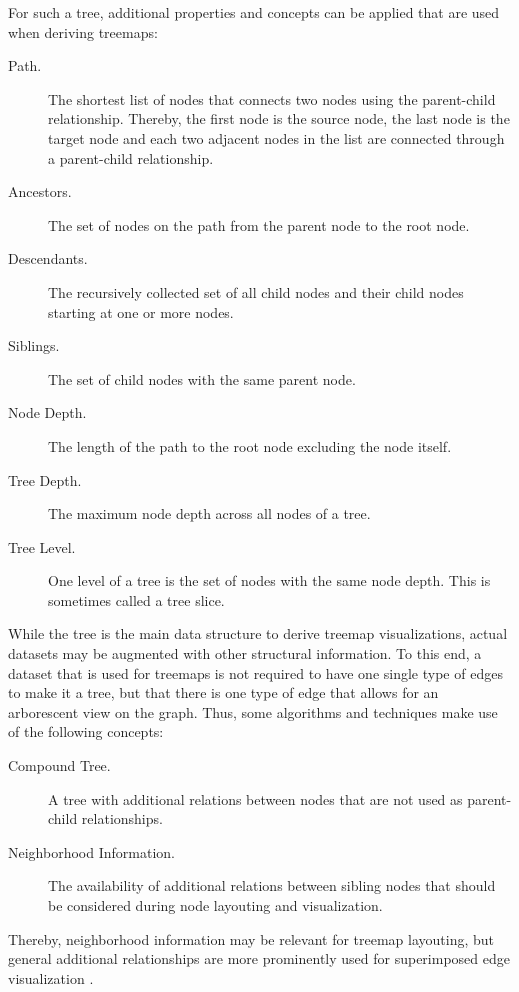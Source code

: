 \documentclass[sigconf%
,natbib=true%
]{acmart}
\begin{document}
\noindent For such a tree, additional properties and concepts can be applied that are used when deriving treemaps:
\begin{description}
	\item[Path.] The shortest list of nodes that connects two nodes using the parent-child relationship. Thereby, the first node is the source node, the last node is the target node and each two adjacent nodes in the list are connected through a parent-child relationship.
	\item[Ancestors.] The set of nodes on the path from the parent node to the root node.
	\item[Descendants.] The recursively collected set of all child nodes and their child nodes starting at one or more nodes.
	\item[Siblings.] The set of child nodes with the same parent node.
	\item[Node Depth.] The length of the path to the root node excluding the node itself.
	\item[Tree Depth.] The maximum node depth across all nodes of a tree.
	\item[Tree Level.] One level of a tree is the set of nodes with the same node depth. This is sometimes called a tree slice.
\end{description}
While the tree is the main data structure to derive treemap visualizations, actual datasets may be augmented with other structural information.
To this end, a dataset that is used for treemaps is not required to have one single type of edges to make it a tree, but that there is one type of edge that allows for an arborescent view on the graph.
Thus, some algorithms and techniques make use of the following concepts:
\begin{description}
	\item[Compound Tree.] A tree with additional relations between nodes that are not used as parent-child relationships.
	\item[Neighborhood Information.] The availability of additional relations between sibling nodes that should be considered during node layouting and visualization.
\end{description}
Thereby, neighborhood information may be relevant for treemap layouting, but general additional relationships are more prominently used for superimposed edge visualization \cite{holten2006-edgebundles}.
\end{document}
